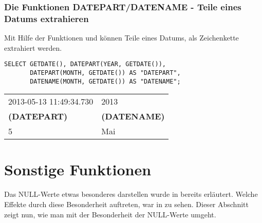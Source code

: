 \subsubsection{Die Funktionen DATEPART/DATENAME - Teile eines Datums extrahieren}
Mit Hilfe der Funktionen  und  können Teile eines Datums, als Zeichenkette extrahiert werden.
\begin{lstlisting}[language=ms_sql,caption={\languagemssql{DATEPART} und \languagemssql{DATENAME} in SQL Server},label=sql03_24]
SELECT GETDATE(), DATEPART(YEAR, GETDATE()),
       DATEPART(MONTH, GETDATE()) AS "DATEPART",
       DATENAME(MONTH, GETDATE()) AS "DATENAME";
          \end{lstlisting}
\begin{center}
    \begin{small}
        \tabletail{}
        \tablelasttail{}
        \begin{mssql}
            \begin{supertabular}{ll}
                2013-05-13 11:49:34.730 & 2013 \\
                \textbf{(DATEPART)} & \textbf{(DATENAME)} \\
                \cmidrule(l){1-1}\cmidrule(l){2-2}
                5 & Mai \\
            \end{supertabular}
        \end{mssql}
    \end{small}
\end{center}
\section{Sonstige Funktionen}
Das NULL-Werte etwas besonderes darstellen wurde in 
bereits erläutert. Welche Effekte durch diese Besonderheit auftreten,
war in  zu sehen. Dieser Abschnitt zeigt nun, wie man
mit der Besonderheit der NULL-Werte umgeht.

